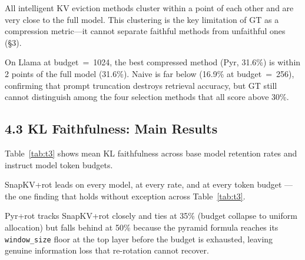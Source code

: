 \documentclass[10pt,letterpaper]{article}
\begin{document}
All intelligent KV eviction methods cluster within a point of each other 
and are very close to the full model.  This clustering is the key limitation of GT as a 
compression metric---it cannot separate faithful methods from unfaithful ones (§3). 

On Llama at budget~=~1024, the best compressed method (Pyr, 31.6\%) is within
2 points of the full model (31.6\%). Naive is far below (16.9\% at budget~=~256), 
confirming that prompt truncation destroys retrieval accuracy, 
but GT still cannot distinguish among the four selection methods that all score above 30\%.

\hypertarget{kl-faithfulness-main-results}{%
\subsection{4.3 KL Faithfulness: Main
Results}\label{kl-faithfulness-main-results}}
Table~\ref{tab:t3} shows mean KL faithfulness across base model retention
rates and instruct model token budgets.

SnapKV+rot leads on every model, at every rate, and at every token budget --- the one 
finding that holds without exception across Table~\ref{tab:t3}. 

Pyr+rot tracks SnapKV+rot closely and ties at 35\% (budget collapse to 
uniform allocation) but falls behind at 50\% because the pyramid formula reaches its 
\texttt{window\_size} floor at the top layer before the budget is exhausted, 
leaving genuine information loss that re-rotation cannot recover.
\end{document}
